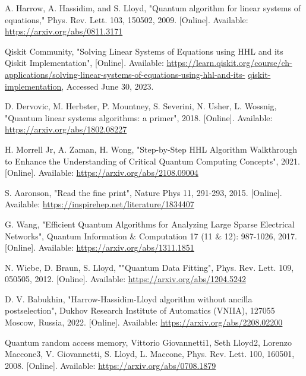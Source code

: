 \begin{thebibliography}{00}

A. Harrow, A. Hassidim, and S. Lloyd, 
"Quantum algorithm for linear systems of equations," 
Phys. Rev. Lett. 103, 150502, 
2009.
[Online]. Available: \url{https://arxiv.org/abs/0811.3171} 

Qiskit Community,  
"Solving Linear Systems of Equations using HHL and its Qiskit Implementation", 
[Online]. Available: 
\url{https://learn.qiskit.org/}\url{course/ch-applications}\url{/solving-linear-systems-of-equations-}\url{using-hhl-and-its-}
\url{qiskit-implementation},  
Accessed June 30, 
2023.

D. Dervovic, M. Herbster, P. Mountney, S. Severini, N. Usher, L. Wossnig, 
"Quantum linear systems algorithms: a primer", 
2018.
[Online]. Available: \url{ https://arxiv.org/abs/1802.08227}

H. Morrell Jr, A. Zaman, H. Wong, 
"Step-by-Step HHL Algorithm Walkthrough to Enhance the Understanding of Critical Quantum Computing Concepts", 
2021.
[Online]. Available: \url{ https://arxiv.org/abs/2108.09004}

S. Aaronson, 
"Read the fine print",  
Nature Phys 11, 291-293, 
2015.
[Online]. Available: \url{ https://inspirehep.net/literature/1834407}


G. Wang, 
"Efficient Quantum Algorithms for Analyzing Large Sparse Electrical Networks",
Quantum Information \& Computation 17 (11 \& 12): 987-1026, 
2017. 
[Online]. Available: \url{ https://arxiv.org/abs/1311.1851}

N. Wiebe, D. Braun, S. Lloyd, 
""Quantum Data Fitting", 
Phys. Rev. Lett. 109, 050505, 
2012.
[Online]. Available: \url{ https://arxiv.org/abs/1204.5242}

D. V. Babukhin, 
"Harrow-Hassidim-Lloyd algorithm without ancilla postselection",
Dukhov Research Institute of Automatics (VNIIA), 127055 Moscow, Russia,
2022.
[Online]. Available: \url{ https://arxiv.org/abs/2208.02200}

Quantum random access memory,
Vittorio Giovannetti1, Seth Lloyd2, Lorenzo Maccone3,
V. Giovannetti, S. Lloyd, L. Maccone, Phys. Rev. Lett. 100, 160501,
2008.
[Online]. Available: \url{ https://arxiv.org/abs/0708.1879}


\end{thebibliography}



